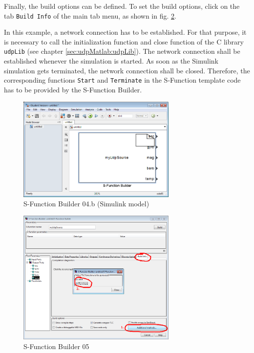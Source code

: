 Finally, the build options can be defined. To set the build options, click on the tab \texttt{Build Info} of the main tab menu, as shown in fig. \ref{fig:udpMatlab:simulinkBlock:builder:step5}.

In this example, a network connection has to be established. For that purpose, it is necessary to call the initialization function and close function of the C library \texttt{udpLib} (see chapter \ref{sec:udpMatlab:udpLib}). The network connection shall be established whenever the simulation is started. As soon as the Simulink simulation gets terminated, the network connection shall be closed. Therefore, the corresponding functions \texttt{Start} and \texttt{Terminate} in the S-Function template code has to be provided by the S-Function Builder.

\begin{figure}[H]
    \centering
    \includegraphics[width=0.7\textwidth]{fig/ch-matlab-lib/sFuncBuilder_matlabModel_toBuilder_01}
    \caption{S-Function Builder 04.b (Simulink model)}
    \label{fig:udpMatlab:simulinkBlock:builder:step4_model}
\end{figure}

\begin{figure}[H]
    \centering
    \includegraphics[width=0.7\textwidth]{fig/ch-matlab-lib/sFuncBuilder_matlabBuilder_02}
    \caption{S-Function Builder 05}
    \label{fig:udpMatlab:simulinkBlock:builder:step5}
\end{figure}

